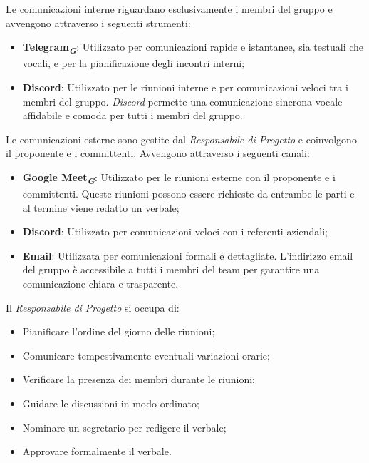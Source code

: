 Le comunicazioni interne riguardano esclusivamente i membri del gruppo e avvengono attraverso i seguenti strumenti:
\begin{itemize}
    \item \textbf{Telegram}\textsubscript{\textit{\textbf{G}}}: Utilizzato per comunicazioni rapide e istantanee, sia testuali che vocali, e per la pianificazione degli incontri interni;
    \item \textbf{Discord}: Utilizzato per le riunioni interne e per comunicazioni veloci tra i membri del gruppo. \emph{Discord} permette una comunicazione sincrona vocale affidabile e comoda per tutti i membri del gruppo.
\end{itemize}

Le comunicazioni esterne sono gestite dal \emph{Responsabile di Progetto} e coinvolgono il proponente e i committenti. Avvengono attraverso i seguenti canali:
\begin{itemize}
    \item \textbf{Google Meet}\textsubscript{\textit{\textbf{G}}}: Utilizzato per le riunioni esterne con il proponente e i committenti. Queste riunioni possono essere richieste da entrambe le parti e al termine viene redatto un verbale;
    \item \textbf{Discord}: Utilizzato per comunicazioni veloci con i referenti aziendali;
    \item \textbf{Email}: Utilizzata per comunicazioni formali e dettagliate. L'indirizzo email del gruppo è accessibile a tutti i membri del team per garantire una comunicazione chiara e trasparente.
\end{itemize}

Il \emph{Responsabile di Progetto} si occupa di:
\begin{itemize}
    \item Pianificare l'ordine del giorno delle riunioni;
    \item Comunicare tempestivamente eventuali variazioni orarie;
    \item Verificare la presenza dei membri durante le riunioni;
    \item Guidare le discussioni in modo ordinato;
    \item Nominare un segretario per redigere il verbale;
    \item Approvare formalmente il verbale.
\end{itemize}

